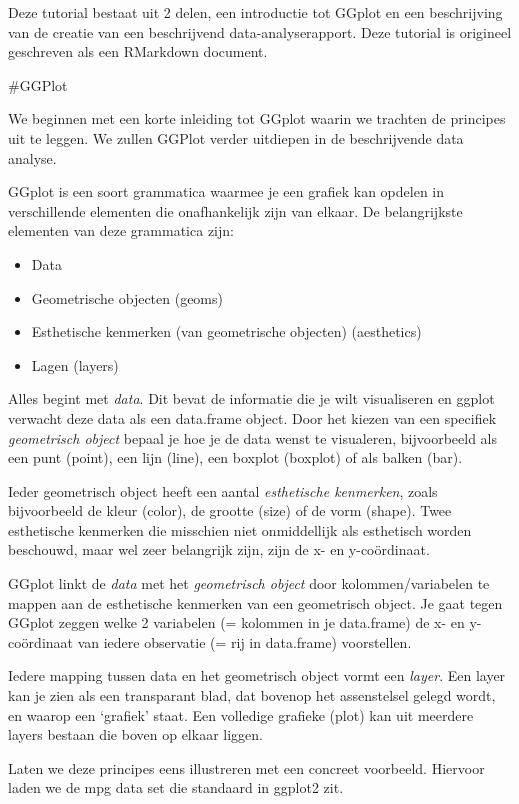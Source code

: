 \documentclass[]{memoir}
\providecommand{\tightlist}{%
  \setlength{\itemsep}{0pt}\setlength{\parskip}{0pt}}
\begin{document}
Deze tutorial bestaat uit 2 delen, een introductie tot GGplot en een beschrijving van de creatie van een beschrijvend data-analyserapport. Deze tutorial is origineel geschreven als een RMarkdown document.

\#GGPlot

We beginnen met een korte inleiding tot GGplot waarin we trachten de principes uit te leggen. We zullen GGPlot verder uitdiepen in de beschrijvende data analyse.

GGplot is een soort grammatica waarmee je een grafiek kan opdelen in verschillende elementen die onafhankelijk zijn van elkaar. De belangrijkste elementen van deze grammatica zijn:

\begin{itemize}
\tightlist
\item
  Data
\item
  Geometrische objecten (geoms)
\item
  Esthetische kenmerken (van geometrische objecten) (aesthetics)
\item
  Lagen (layers)
\end{itemize}

Alles begint met \emph{data}. Dit bevat de informatie die je wilt visualiseren en ggplot verwacht deze data als een data.frame object. Door het kiezen van een specifiek \emph{geometrisch object} bepaal je hoe je de data wenst te visualeren, bijvoorbeeld als een punt (point), een lijn (line), een boxplot (boxplot) of als balken (bar).

Ieder geometrisch object heeft een aantal \emph{esthetische kenmerken}, zoals bijvoorbeeld de kleur (color), de grootte (size) of de vorm (shape). Twee esthetische kenmerken die misschien niet onmiddellijk als esthetisch worden beschouwd, maar wel zeer belangrijk zijn, zijn de x- en y-coördinaat.

GGplot linkt de \emph{data} met het \emph{geometrisch object} door kolommen/variabelen te mappen aan de esthetische kenmerken van een geometrisch object. Je gaat tegen GGplot zeggen welke 2 variabelen (= kolommen in je data.frame) de x- en y-coördinaat van iedere observatie (= rij in data.frame) voorstellen.

Iedere mapping tussen data en het geometrisch object vormt een \emph{layer}. Een layer kan je zien als een transparant blad, dat bovenop het assenstelsel gelegd wordt, en waarop een `grafiek' staat. Een volledige grafieke (plot) kan uit meerdere layers bestaan die boven op elkaar liggen.

Laten we deze principes eens illustreren met een concreet voorbeeld. Hiervoor laden we de mpg data set die standaard in ggplot2 zit.
\end{document}

